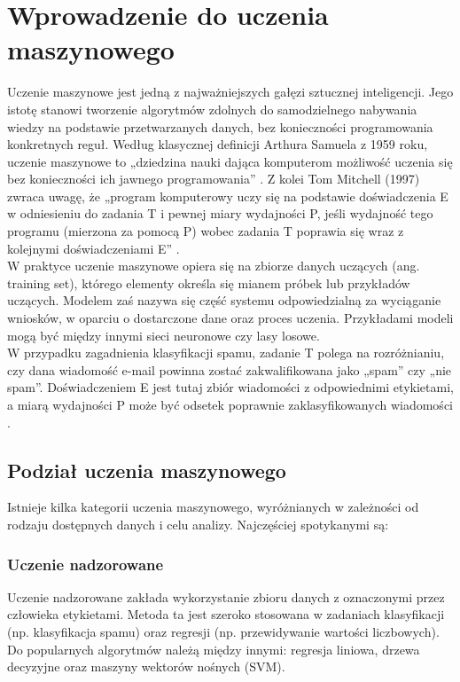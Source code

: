 \documentclass[a4paper, 12pt]{article}
\begin{document}
    \section{Wprowadzenie do uczenia maszynowego}
    Uczenie maszynowe jest jedną z najważniejszych gałęzi sztucznej inteligencji.
    Jego istotę stanowi tworzenie algorytmów zdolnych do samodzielnego nabywania wiedzy na podstawie przetwarzanych danych, bez konieczności programowania konkretnych reguł. 
    Według klasycznej definicji Arthura Samuela z 1959 roku, uczenie maszynowe to „dziedzina nauki dająca komputerom możliwość uczenia się bez konieczności ich jawnego programowania” \cite{samuel1959checkers}.
    Z kolei Tom Mitchell (1997) zwraca uwagę, że „program komputerowy uczy się na podstawie doświadczenia E w odniesieniu do zadania T i pewnej miary wydajności P, jeśli wydajność tego programu (mierzona za pomocą P) wobec zadania T poprawia się wraz z kolejnymi doświadczeniami E” \cite{mitchell1997machinelearning}.
    \\ 
    \indent W praktyce uczenie maszynowe opiera się na zbiorze danych uczących (ang. training set), którego elementy określa się mianem próbek lub przykładów uczących. 
    Modelem zaś nazywa się część systemu odpowiedzialną za wyciąganie wniosków, w oparciu o dostarczone dane oraz proces uczenia. 
    Przykładami modeli mogą być między innymi sieci neuronowe czy lasy losowe.
    \\
    \indent W przypadku zagadnienia klasyfikacji spamu, zadanie T polega na rozróżnianiu, czy dana wiadomość e-mail powinna zostać zakwalifikowana jako „spam” czy „nie spam”. 
    Doświadczeniem E jest tutaj zbiór wiadomości z odpowiednimi etykietami, a miarą wydajności P może być odsetek poprawnie zaklasyfikowanych wiadomości \cite{HandsOnMachineLearning}.
    
    \subsection{Podział uczenia maszynowego}
    Istnieje kilka kategorii uczenia maszynowego, wyróżnianych w zależności od rodzaju dostępnych danych i celu analizy. Najczęściej spotykanymi są:
    
    \subsubsection{Uczenie nadzorowane}
    Uczenie nadzorowane zakłada wykorzystanie zbioru danych z oznaczonymi przez człowieka etykietami. Metoda ta jest szeroko stosowana w zadaniach klasyfikacji (np. klasyfikacja spamu) oraz regresji (np. przewidywanie wartości liczbowych). Do popularnych algorytmów należą między innymi: regresja liniowa, drzewa decyzyjne oraz maszyny wektorów nośnych (SVM).
\end{document}
